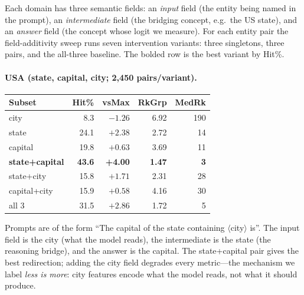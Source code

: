 Each domain has three semantic fields: an \emph{input} field (the entity being named in the prompt), an \emph{intermediate} field (the bridging concept, e.g.\ the US state), and an \emph{answer} field (the concept whose logit we measure). For each entity pair the field-additivity sweep runs seven intervention variants: three singletons, three pairs, and the all-three baseline. The bolded row is the best variant by Hit\%.

\paragraph{USA (state, capital, city; 2{,}450 pairs/variant).}
\begin{center}\small
\begin{tabular}{lrrrr}
\toprule
Subset & Hit\% & vsMax & RkGrp & MedRk \\
\midrule
city                &  8.3 & $-1.26$ & 6.92 & 190 \\
state               & 24.1 & $+2.38$ & 2.72 & 14 \\
capital             & 19.8 & $+0.63$ & 3.69 & 11 \\
\textbf{state+capital} & \textbf{43.6} & \textbf{+4.00} & \textbf{1.47} & \textbf{3} \\
state+city          & 15.8 & $+1.71$ & 2.31 & 28 \\
capital+city        & 15.9 & $+0.58$ & 4.16 & 30 \\
all 3               & 31.5 & $+2.86$ & 1.72 & 5 \\
\bottomrule
\end{tabular}
\end{center}

Prompts are of the form ``The capital of the state containing $\langle$city$\rangle$ is''. The input field is the city (what the model reads), the intermediate is the state (the reasoning bridge), and the answer is the capital. The state+capital pair gives the best redirection; adding the city field degrades every metric---the mechanism we label \emph{less is more}: city features encode what the model reads, not what it should produce.

